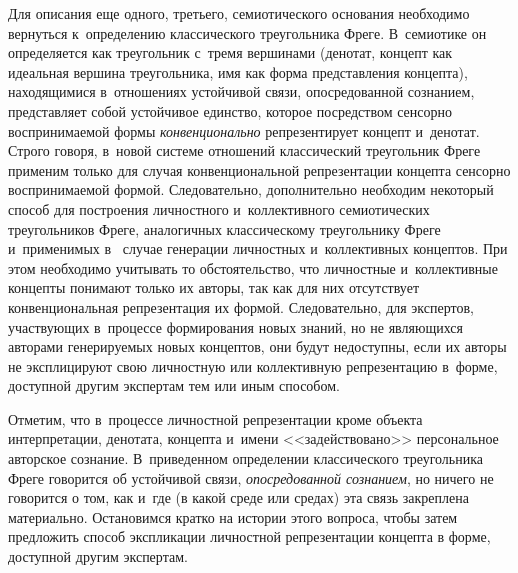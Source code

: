 {\begin{multicols}{2}
      Для описания еще одного, третьего, семиотического основания необходимо 
вернуться к~определению классического треугольника Фреге. В~семиотике он определяется 
как треугольник с~тремя вершинами (денотат, концепт как идеальная вершина 
треугольника, имя как форма представления концепта), находящимися в~отношениях 
устойчивой связи, опосредованной сознанием, представляет собой устойчивое единство, 
которое посредством сенсорно воспринимаемой формы \textit{конвенционально} 
репрезентирует концепт и~денотат. Строго говоря, в~новой системе отношений 
классический треугольник Фреге применим только для случая конвенциональной 
репрезентации концепта сенсорно воспринимаемой формой. Следовательно, дополнительно 
необходим некоторый способ для построения личностного и~коллективного семиотических 
треугольников Фреге, аналогичных классическому треугольнику Фреге и~применимых в~
случае генерации личностных и~коллективных концептов. При этом необходимо учитывать 
то обстоятельство, что личностные и~коллективные концепты понимают только их авторы, 
так как для них отсутствует конвенциональная репрезентация их формой. Следовательно, 
для экспертов, участвующих в~процессе формирования новых знаний, но не являющихся 
авторами генерируемых новых концептов, они будут недоступны, если их авторы не 
эксплицируют свою личностную или коллективную репрезентацию в~форме, доступной 
другим экспертам тем или иным способом.
      
      Отметим, что в~процессе личностной репрезентации кроме объекта интерпретации, 
денотата, концепта и~имени <<задействовано>> персональное авторское сознание. 
В~приведенном определении классического треугольника Фреге говорится об устойчивой 
связи, \textit{опосредованной сознанием}, но ничего не говорится о том, как и~где (в какой 
среде или средах) эта связь закреплена материально. Остановимся кратко на истории этого 
вопроса, чтобы затем предложить способ экспликации личностной репрезентации концепта 
в форме, доступной другим экспертам.

\begin{figure*} %
       \vspace*{1pt}
 \begin{center}
 \mbox{%
 \epsfxsize=138.786mm
 }
 \end{center}
 \vspace*{-9pt}
\end{figure*}
      

\end{multicols}}
